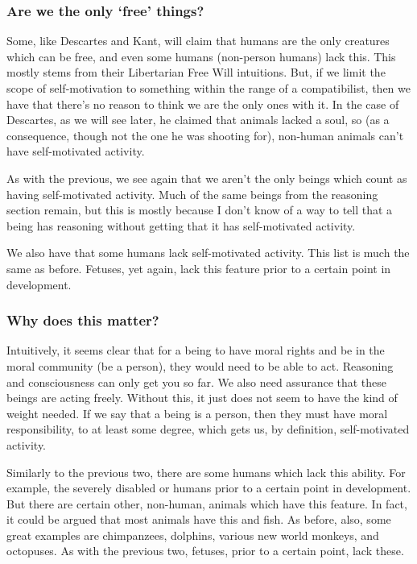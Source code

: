 \subsubsection{Are we the only `free' things?}

Some, like Descartes and Kant, will claim that humans are the only creatures which can be free, and even some humans (non-person humans) lack this. This mostly stems from their Libertarian Free Will intuitions. But, if we limit the scope of self-motivation to something within the range of a compatibilist, then we have that there's no reason to think we are the only ones with it. In the case of Descartes, as we will see later, he claimed that animals lacked a soul, so (as a consequence, though not the one he was shooting for), non-human animals can't have self-motivated activity. 

As with the previous, we see again that we aren't the only beings which count as having self-motivated activity. Much of the same beings from the reasoning section remain, but this is mostly because I don't know of a way to tell that a being has reasoning without getting that it has self-motivated activity.

We also have that some humans lack self-motivated activity. This list is much the same as before. Fetuses, yet again, lack this feature prior to a certain point in development.

\subsubsection{Why does this matter?}

Intuitively, it seems clear that for a being to have moral rights and be in the moral community (be a person), they would need to be able to act. Reasoning and consciousness can only get you so far. We also need assurance that these beings are acting freely. Without this, it just does not seem to have the kind of weight needed. If we say that a being is a person, then they must have moral responsibility, to at least some degree, which gets us, by definition, self-motivated activity.  

Similarly to the previous two, there are some humans which lack this ability. For example, the severely disabled or humans prior to a certain point in development. But there are certain other, non-human, animals which have this feature. In fact, it could be argued that most animals have this and fish. As before, also, some great examples are chimpanzees, dolphins, various new world monkeys, and octopuses. As with the previous two, fetuses, prior to a certain point, lack these. 


